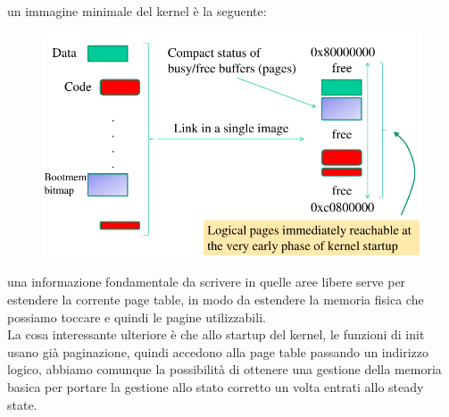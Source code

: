 \documentclass[12pt, oneside]{extbook}
\begin{document}
un immagine minimale del kernel è la seguente:
\begin{figure}[!h]
	\includegraphics[scale=0.3]{immagini/bootmem_start.png}
\end{figure}
una informazione fondamentale da scrivere in quelle aree libere serve per estendere la corrente page table, in modo da estendere la memoria fisica che possiamo toccare e quindi le pagine utilizzabili.\\ La cosa interessante ulteriore è che allo startup del kernel, le funzioni di init usano già paginazione, quindi accedono alla page table passando un indirizzo logico, abbiamo comunque la possibilità di ottenere una gestione della memoria basica per portare la gestione allo stato corretto un volta entrati allo steady state.
\end{document}

